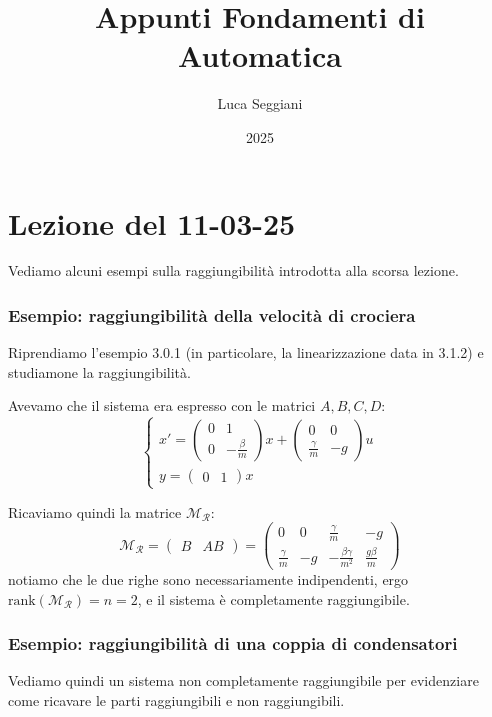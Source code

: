 \documentclass[a4paper,11pt]{article}
\title{Appunti Fondamenti di Automatica}
\author{Luca Seggiani}
\date{2025}
\begin{document}
\section{Lezione del 11-03-25}

\thispagestyle{empty}
\pagestyle{fancy}

Vediamo alcuni esempi sulla raggiungibilità introdotta alla scorsa lezione.

\subsubsection{Esempio: raggiungibilità della velocità di crociera}
Riprendiamo l'esempio 3.0.1 (in particolare, la linearizzazione data in 3.1.2) e studiamone la raggiungibilità.

Avevamo che il sistema era espresso con le matrici $A, B, C, D$:
\[
	\begin{cases}
		x' = \begin{pmatrix}
			0 & 1 \\
			0 & -\frac{\beta}{m}
		\end{pmatrix} x + \begin{pmatrix}
			0 & 0 \\ 
			\frac{\gamma}{m} & -g
		\end{pmatrix}	u \\ 
		y = \begin{pmatrix}
			0 & 1
		\end{pmatrix} x
	\end{cases}
\]

Ricaviamo quindi la matrice $\mathcal{M}_\mathcal{R}$:
$$
\mathcal{M}_\mathcal{R} = \begin{pmatrix}
	B & A B
\end{pmatrix} = \begin{pmatrix}
	0 & 0 & \frac{\gamma}{m} & -g \\
	\frac{\gamma}{m} & -g & -\frac{\beta \gamma}{m^2} & \frac{g \beta}{m}
\end{pmatrix}
$$
notiamo che le due righe sono necessariamente indipendenti, ergo $\mathrm{rank}(\mathcal{M}_\mathcal{R}) = n = 2$, e il sistema è completamente raggiungibile.

\subsubsection{Esempio: raggiungibilità di una coppia di condensatori}
Vediamo quindi un sistema non completamente raggiungibile per evidenziare come ricavare le parti raggiungibili e non raggiungibili.
\end{document}
